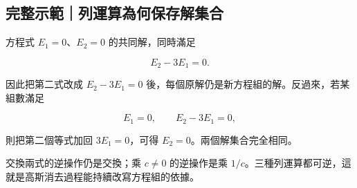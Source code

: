 \documentclass[11pt,a4paper]{article}
\begin{document}
\begin{HandoutWorkedExample}

\subsection{完整示範｜列運算為何保存解集合}\label{ux5b8cux6574ux793aux7bc4ux5217ux904bux7b97ux70baux4f55ux4fddux5b58ux89e3ux96c6ux5408}

方程式 \(E_1=0\)、\(E_2=0\) 的共同解，同時滿足

\[
E_2-3E_1=0.
\]

因此把第二式改成 \(E_2-3E_1=0\) 後，每個原解仍是新方程組的解。反過來，若某組數滿足

\[
E_1=0,\qquad E_2-3E_1=0,
\]

則把第二個等式加回 \(3E_1=0\)，可得 \(E_2=0\)。兩個解集合完全相同。

交換兩式的逆操作仍是交換；乘 \(c\ne0\) 的逆操作是乘 \(1/c\)。三種列運算都可逆，這就是高斯消去過程能持續改寫方程組的依據。

\end{HandoutWorkedExample}
\end{document}
